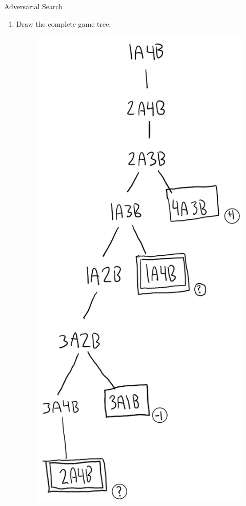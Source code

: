 \documentclass[11pt]{article}
\newenvironment{problem}[2][Problem]{\begin{trivlist}
\item[\hskip \labelsep {\bfseries #1}\hskip \labelsep {\bfseries #2.}]}{\end{trivlist}}
\begin{document}
\begin{problem}{6} Adversarial Search
\begin{enumerate}
	\item Draw the complete game tree.
		\begin{figure}
			\includegraphics[scale=1]{cse545_hw2_p6_a.PNG}

\end{figure}
\end{enumerate}
\end{problem}
\end{document}
